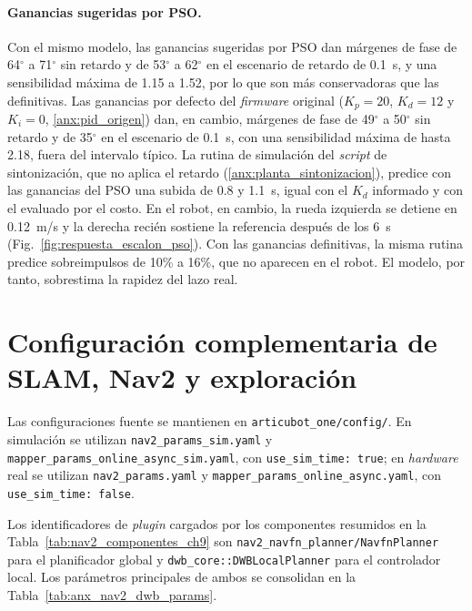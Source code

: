 \begin{appendices}
\paragraph{Ganancias sugeridas por PSO.} Con el mismo modelo, las ganancias
sugeridas por PSO dan márgenes de fase de 64$^\circ$ a 71$^\circ$ sin retardo y
de 53$^\circ$ a 62$^\circ$ en el escenario de retardo de 0.1~s, y una sensibilidad máxima
de 1.15 a 1.52, por lo que son más conservadoras que las definitivas. Las
ganancias por defecto del \textit{firmware} original ($K_p=20$, $K_d=12$ y
$K_i=0$, \ref{anx:pid_origen}) dan, en cambio, márgenes de fase de 49$^\circ$ a
50$^\circ$ sin retardo y de 35$^\circ$ en el escenario de 0.1~s, con una
sensibilidad máxima de hasta 2.18, fuera del intervalo típico. La rutina de
simulación del \textit{script} de sintonización, que
no aplica el retardo (\ref{anx:planta_sintonizacion}), predice con las ganancias del PSO una
subida de 0.8 y 1.1~s, igual con el $K_d$ informado y con el evaluado por el
costo. En el robot, en cambio, la rueda izquierda se detiene en 0.12~m/s y la
derecha recién sostiene la referencia después de los 6~s
(Fig.~\ref{fig:respuesta_escalon_pso}). Con las ganancias definitivas, la misma
rutina predice sobreimpulsos de 10\% a 16\%, que no aparecen en el robot. El
modelo, por tanto, sobrestima la rapidez del lazo real.

\section{Configuración complementaria de SLAM, Nav2 y exploración}
\label{anx:nav2_slam_config}

Las configuraciones fuente se mantienen en \texttt{articubot\_\allowbreak{}one/\allowbreak{}config/}. En simulación se utilizan \texttt{nav2\_params\_sim.yaml} y \texttt{mapper\_params\_online\_async\_sim.yaml}, con \texttt{use\_sim\_time: true}; en \textit{hardware} real se utilizan \texttt{nav2\_params.yaml} y \texttt{mapper\_params\_online\_async.yaml}, con \texttt{use\_sim\_time: false}.

Los identificadores de \textit{plugin} cargados por los componentes resumidos
en la Tabla~\ref{tab:nav2_componentes_ch9} son
\texttt{nav2\_navfn\_planner/NavfnPlanner} para el planificador global y
\texttt{dwb\_core::DWBLocalPlanner} para el controlador local. Los parámetros principales de ambos se consolidan en la
Tabla~\ref{tab:anx_nav2_dwb_params}.


\end{appendices}
